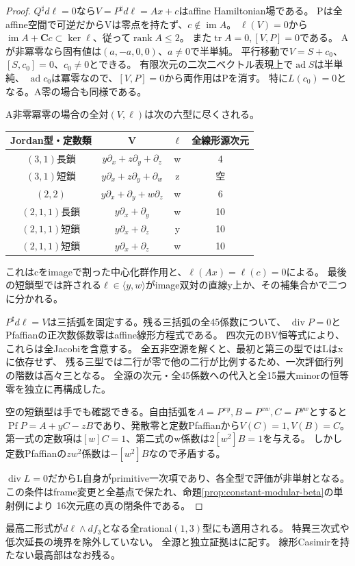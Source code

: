 \documentclass[a4paper,11pt]{ltjsarticle}
\theoremstyle{definition}
\newcommand{\CC}{\mathbf C}
\newcommand{\rank}{\operatorname{rank}}
\begin{document}
\begin{proof}
$Q^\sharp d\ell=0$なら$V=P^\sharp d\ell=Ax+c$はaffine Hamiltonian場である。
Pは全affine空間で可逆だからVは零点を持たず、$c\notin\operatorname{im}A$。
$\ell(V)=0$から$\operatorname{im}A+\CC c\subset\ker\ell$、従って$\rank A\le2$。
また$\operatorname{tr}A=0,[V,P]=0$である。
Aが非冪零なら固有値は$(a,-a,0,0)$、$a\ne0$で半単純。
平行移動で$V=S+c_0$、$[S,c_0]=0$、$c_0\ne0$とできる。
有限次元の二次二ベクトル表現上で$\operatorname{ad}S$は半単純、
$\operatorname{ad}c_0$は冪零なので、$[V,P]=0$から両作用はPを消す。
特に$L(c_0)=0$となる。A零の場合も同様である。

A非零冪零の場合の全対$(V,\ell)$は次の六型に尽くされる。
\begin{center}\small
\begin{tabular}{c|c|c|c}
Jordan型・定数類&V&$\ell$&全線形源次元\\\hline
$(3,1)$長鎖&$y\partial_x+z\partial_y+\partial_z$&w&4\\
$(3,1)$短鎖&$y\partial_x+z\partial_y+\partial_w$&z&空\\
$(2,2)$&$y\partial_x+\partial_y+w\partial_z$&w&6\\
$(2,1,1)$長鎖&$y\partial_x+\partial_y$&w&10\\
$(2,1,1)$短鎖&$y\partial_x+\partial_z$&y&10\\
$(2,1,1)$短鎖&$y\partial_x+\partial_z$&w&10
\end{tabular}
\end{center}
これはcをimageで割った中心化群作用と、$\ell(Ax)=\ell(c)=0$による。
最後の短鎖型では許される$\ell\in\langle y,w\rangle$がimage双対の直線y上か、その補集合かで二つに分かれる。

$P^\sharp d\ell=V$は三括弧を固定する。残る三括弧の全45係数について、
$\operatorname{div}P=0$とPfaffianの正次数係数零はaffine線形方程式である。
四次元のBV恒等式により、これらは全Jacobiを含意する。
全五非空源を解くと、最初と第三の型ではLはxに依存せず、
残る三型では二行が零で他の二行が比例するため、一次評価行列の階数は高々三となる。
全源の次元・全45係数への代入と全15最大minorの恒等零を独立に再構成した。

空の短鎖型は手でも確認できる。自由括弧を$A=P^{xy},B=P^{xw},C=P^{yw}$とすると
$\operatorname{Pf}P=A+yC-zB$であり、発散零と定数Pfaffianから$V(C)=1,V(B)=C$。
第一式の定数項は$[w]C=1$、第二式のw係数は$2[w^2]B=1$を与える。
しかし定数Pfaffianの$zw^2$係数は$-[w^2]B$なので矛盾する。

$\operatorname{div}L=0$だからL自身がprimitive一次項であり、各全型で評価が非単射となる。
この条件はframe変更と全基点で保たれ、命題\ref{prop:constant-modular-beta}の単射例により
16次元底の真の閉条件である。
\end{proof}
最高二形式が$d\ell\wedge df_3$となる全rational$(1,3)$型にも適用される。
特異三次式や低次延長の境界を除外していない。
全源と独立証拠はに記す。
線形Casimirを持たない最高部はなお残る。
\end{document}
